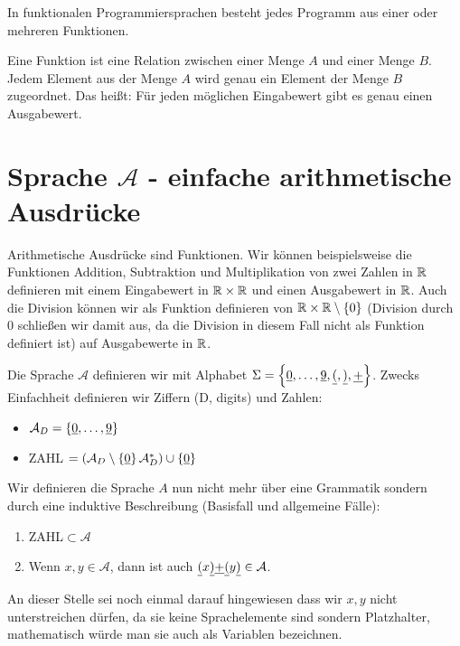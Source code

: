 In funktionalen Programmiersprachen besteht jedes Programm aus einer oder mehreren
Funktionen.
\begin{defn}[Funktion]\label{defn:Funktion}
Eine Funktion ist eine Relation zwischen einer Menge $A$ und einer Menge $B$.
Jedem Element aus der Menge $A$ wird genau ein Element der Menge $B$ zugeordnet.
Das heißt: Für jeden möglichen Eingabewert gibt es genau einen Ausgabewert.
\end{defn}

\section{Sprache $\mathcal{A}$ - einfache arithmetische Ausdrücke}
Arithmetische Ausdrücke sind Funktionen. Wir können beispielsweise die Funktionen
Addition, Subtraktion und Multiplikation von zwei Zahlen in $\mathbb{R}$ definieren mit einem
Eingabewert in $\mathbb{R} \times \mathbb{R}$ und einen Ausgabewert in $\mathbb{R}$. Auch die Division
können wir als Funktion definieren von $\mathbb{R} \times \mathbb{R} \setminus \left\{0\right\}$ (Division durch $0$ schließen
wir damit aus, da die Division in diesem Fall nicht als Funktion definiert ist) auf Ausgabewerte in $\mathbb{R}$.

\begin{defn}
Die Sprache $\mathcal{A}$ definieren wir mit Alphabet $\Sigma=\left\{\underline{0},\ldots,\underline{9},\underline{(},\underline{)},\underline{+}\right\}$.
Zwecks Einfachheit definieren wir Ziffern (D, digits) und Zahlen:
\begin{itemize}
\item $\mathcal{A}_D = \left\{\underline{0},\ldots,\underline{9}\right\}$
\item ZAHL $= (\mathcal{A}_D \setminus \left\{\underline{0}\right\} \mathcal{A}_D^*) \cup \left\{\underline{0}\right\}$
\end{itemize}
Wir definieren die Sprache $A$ nun nicht mehr über eine Grammatik sondern durch eine induktive Beschreibung (Basisfall und allgemeine Fälle):
\begin{enumerate}
\item ZAHL$\subset \mathcal{A}$
\item Wenn $x,y \in \mathcal{A}$, dann ist auch $\underline{(} x \underline{)} \underline{+} \underline{(} y \underline{)} \in \mathcal{A}$.
\end{enumerate}
\end{defn}
An dieser Stelle sei noch einmal darauf hingewiesen dass wir $x,y$ nicht unterstreichen dürfen, da sie keine Sprachelemente sind sondern
Platzhalter, mathematisch würde man sie auch als Variablen bezeichnen.

